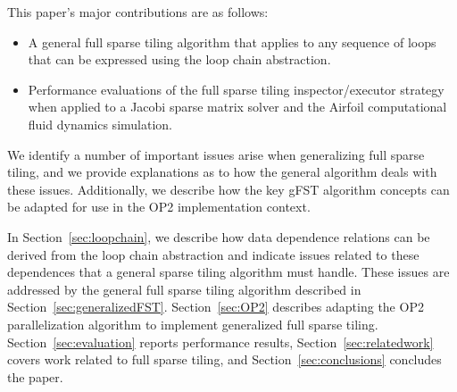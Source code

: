 This paper's major contributions are as follows:
\begin{itemize}
\item A general full sparse tiling algorithm that applies to any sequence of loops that
  can be expressed using the loop chain abstraction.
  \item Performance evaluations of the full sparse tiling inspector/executor strategy 
  when applied to a Jacobi sparse matrix solver %
  and the Airfoil computational fluid dynamics simulation.
\end{itemize}
We identify a number of important issues arise when
 generalizing full sparse tiling, and we provide
explanations as to how the general algorithm deals with these issues.
Additionally, we describe how the key gFST algorithm concepts can
be adapted for use in the OP2 implementation context.
 
In Section~\ref{sec:loopchain}, we describe how data dependence relations can
be derived from the loop chain abstraction and indicate issues related to these
dependences that a general sparse tiling algorithm must handle.
These issues are addressed by the general full sparse tiling 
algorithm described in Section~\ref{sec:generalizedFST}.
Section~\ref{sec:OP2} describes adapting the OP2
parallelization algorithm to implement
generalized full sparse tiling.
Section~\ref{sec:evaluation} reports performance results,
Section~\ref{sec:relatedwork} covers work related to full sparse tiling, 
and Section~\ref{sec:conclusions} concludes the paper.

